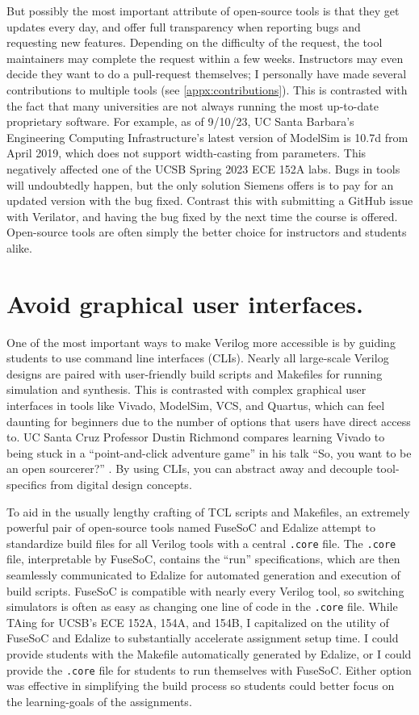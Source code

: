 But possibly the most important attribute of open-source tools is that they get updates every day, and offer full transparency when reporting bugs and requesting new features. Depending on the difficulty of the request, the tool maintainers may complete the request within a few weeks. Instructors may even decide they want to do a pull-request themselves; I personally have made several contributions to multiple tools (see \autoref{appx:contributions}). This is contrasted with the fact that many universities are not always running the most up-to-date proprietary software. For example, as of 9/10/23, UC Santa Barbara's Engineering Computing Infrastructure's latest version of ModelSim is 10.7d from April 2019, which does not support width-casting from parameters. This negatively affected one of the UCSB Spring 2023 ECE 152A labs. Bugs in tools will undoubtedly happen, but the only solution Siemens offers is to pay for an updated version with the bug fixed. Contrast this with submitting a GitHub issue with Verilator, and having the bug fixed by the next time the course is offered. Open-source tools are often simply the better choice for instructors and students alike.

\section{Avoid graphical user interfaces.}

One of the most important ways to make Verilog more accessible is by guiding students to use command line interfaces (CLIs). Nearly all large-scale Verilog designs are paired with user-friendly build scripts and Makefiles for running simulation and synthesis. This is contrasted with complex graphical user interfaces in tools like Vivado, ModelSim, VCS, and Quartus, which can feel daunting for beginners due to the number of options that users have direct access to. UC Santa Cruz Professor Dustin Richmond compares learning Vivado to being stuck in a \enquote{point-and-click adventure game} in his talk \enquote{So, you want to be an open sourcerer?} \cite{RichmondLatchUp}. By using CLIs, you can abstract away and decouple tool-specifics from digital design concepts.

To aid in the usually lengthy crafting of TCL scripts and Makefiles, an extremely powerful pair of open-source tools named FuseSoC and Edalize \cite{fusesocGitHub, edalizeGitHub} attempt to standardize build files for all Verilog tools with a central \texttt{.core} file. The \texttt{.core} file, interpretable by FuseSoC, contains the \enquote{run} specifications, which are then seamlessly communicated to Edalize for automated generation and execution of build scripts. FuseSoC is compatible with nearly every Verilog tool, so switching simulators is often as easy as changing one line of code in the \texttt{.core} file. While TAing for UCSB's ECE 152A, 154A, and 154B, I capitalized on the utility of FuseSoC and Edalize to substantially accelerate assignment setup time. I could provide students with the Makefile automatically generated by Edalize, or I could provide the \texttt{.core} file for students to run themselves with FuseSoC. Either option was effective in simplifying the build process so students could better focus on the learning-goals of the assignments.
